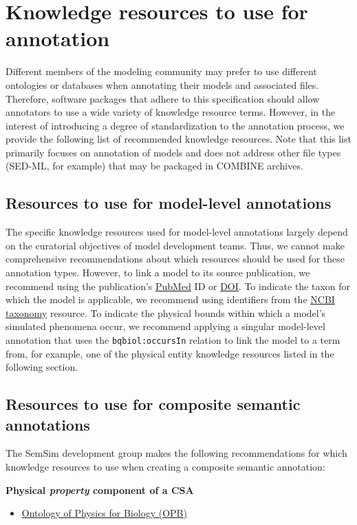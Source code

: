 \documentclass[pdftex,rgb,dvipsnames,svgnames,hyperref,table]{report}
\begin{document}
\section{Knowledge resources to use for annotation}
Different members of the modeling community may prefer to use different ontologies or databases when annotating their models and associated files. Therefore, software packages that adhere to this specification should allow annotators to use a wide variety of knowledge resource terms. However, in the interest of introducing a degree of standardization to the annotation process, we provide the following list of recommended knowledge resources. Note that this list primarily focuses on annotation of models and does not address other file types (SED-ML, for example) that may be packaged in COMBINE archives. 

\subsection{Resources to use for model-level annotations}
The specific knowledge resources used for model-level annotations largely depend on the curatorial objectives of model development teams. Thus, we cannot make comprehensive recommendations about which resources should be used for these annotation types. However, to link a model to its source publication, we recommend using the publication's \href{https://registry.identifiers.org/registry/pubmed}{PubMed} ID or \href{https://registry.identifiers.org/registry/doi}{DOI}. To indicate the taxon for which the model is applicable, we recommend using identifiers from the \href{https://registry.identifiers.org/registry/taxonomy}{NCBI taxonomy} resource. To indicate the physical bounds within which a model's simulated phenomena occur, we recommend applying a singular model-level annotation that uses the \texttt{bqbiol:occursIn} relation to link the model to a term from, for example, one of the physical entity knowledge resources listed in the following section.


\subsection{Resources to use for composite semantic annotations}
The SemSim development group makes the following recommendations for which knowledge resources to use when creating a composite semantic annotation:

\textbf{Physical \textit{property} component of a CSA}
\begin{itemize}
\item \href{https://registry.identifiers.org/registry/opb}{Ontology of Physics for Biology (OPB)}
\end{itemize}
\end{document}
